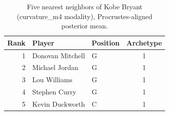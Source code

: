 \begin{table}[htbp]
  \centering\small
  \begin{tabular}{rllc}
    \toprule
    Rank & Player & Position & Archetype \\
    \midrule
    1 & Donovan Mitchell & G & 1 \\
    2 & Michael Jordan & G & 1 \\
    3 & Lou Williams & G & 1 \\
    4 & Stephen Curry & G & 1 \\
    5 & Kevin Duckworth & C & 1 \\
    \bottomrule
  \end{tabular}
  \caption{Five nearest neighbors of Kobe Bryant (curvature_m4 modality), Procrustes-aligned posterior mean.}
  \label{tab:Kobe_Bryant_neighbors_curvature_m4}
\end{table}

